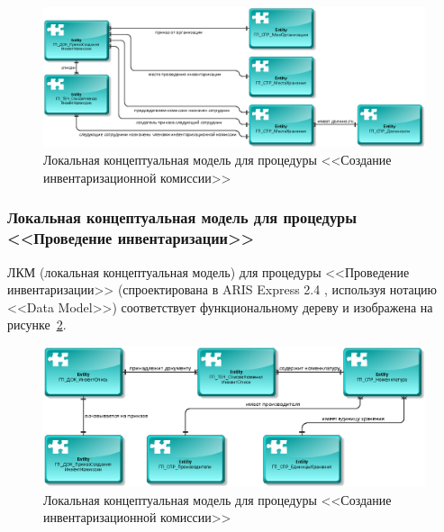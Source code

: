 \begin{figure}[!h]
    \centering

    \includegraphics[width=18cm]
    {assets/ARIS/DataModel/ConceptualModels/ГП_ДОК_ПриказСозданияИнвентКомиссии.png}

    \caption{Локальная концептуальная модель для процедуры <<Создание инвентаризационной комиссии>>}

    \label{fig:DE_DOC_OrderCreationInventoryCommission}
\end{figure}

\subsubsection*{Локальная концептуальная модель для процедуры <<Проведение инвентаризации>>}

ЛКМ (локальная концептуальная модель)
для процедуры <<Проведение инвентаризации>>
(спроектирована в ARIS Express 2.4 \cite{ArisExpress}, используя нотацию <<Data Model>>)
соответствует функциональному дереву
и изображена на рисунке~\ref{fig:DE_DOC_InventoryList}.

\begin{figure}[!h]
    \centering

    \includegraphics[width=18cm]
    {assets/ARIS/DataModel/ConceptualModels/ГП_ДОК_ИнвентОпись.png}

    \caption{Локальная концептуальная модель для процедуры <<Создание инвентаризационной комиссии>>}

    \label{fig:DE_DOC_InventoryList}
\end{figure}

